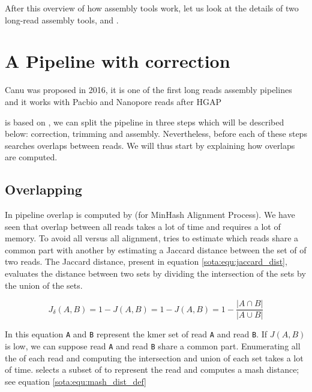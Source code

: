 \documentclass[main]{subfiles}
\begin{document}
After this overview of how \OLC assembly tools work, let us look at the details of two long-read \OLC assembly tools, \canu and \miniasm.

\section{A Pipeline with correction \canu} \label{section:sota:canu}

Canu \cite{canu} was proposed in 2016, it is one of the first long reads assembly pipelines and it works with Pacbio and Nanopore reads after HGAP \cite{hgap}

\canu is based on  \cite{celera_first, celera_second}, we can split the \canu pipeline in three steps which will be described below: correction, trimming and assembly. Nevertheless, before each of these steps \canu searches overlaps between reads. We will thus start by explaining how overlaps are computed.

\subsection{Overlapping} \label{subsec:sota:canu:overlapping}

In \canu pipeline overlap is computed by \mhap (for MinHash Alignment Process). We have seen that overlap between all reads takes a lot of time and requires a lot of memory. To avoid all versus all alignment, \mhap tries to estimate which reads share a common part with another by estimating a Jaccard distance between the set of \kmers of two reads. The Jaccard distance, present in equation \ref{sota:equ:jaccard_dist}, evaluates the distance between two sets by dividing the intersection of the sets by the union of the sets.

\begin{equation}
J_{\delta}(A,B) = 1 - J(A,B) = 1 -  J(A,B) = 1 - \frac{|A \cap B|}{|A \cup B|}
\label{sota:equ:jaccard_dist}
\end{equation}

In this equation \texttt{A} and \texttt{B} represent the kmer set of read \texttt{A} and read \texttt{B}. If $J(A,B)$ is low, we can suppose read \texttt{A} and read \texttt{B} share a common part.
Enumerating all the \kmers of each read and computing the intersection and union of each set takes a lot of time. \mhap selects a subset of \kmers to represent the read and computes a mash distance; \cite{mash_distance} see equation \ref{sota:equ:mash_dist_def} 
\end{document}
